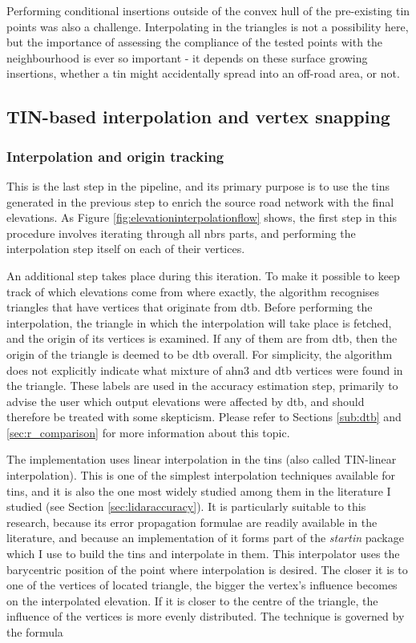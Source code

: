 Performing conditional insertions outside of the convex hull of the pre-existing \ac{tin} points was also a challenge. Interpolating in the triangles is not a possibility here, but the importance of assessing the compliance of the tested points with the neighbourhood is ever so important - it depends on these surface growing insertions, whether a \ac{tin} might accidentally spread into an off-road area, or not.

\subsection{TIN-based interpolation and vertex snapping}
\label{sub:m_interpolation}

\subsubsection{Interpolation and origin tracking}

This is the last step in the pipeline, and its primary purpose is to use the \ac{tin}s generated in the previous step to enrich the source road network with the final elevations. As Figure \ref{fig:elevationinterpolationflow} shows, the first step in this procedure involves iterating through all \ac{nbrs} parts, and performing the interpolation step itself on each of their vertices.

An additional step takes place during this iteration. To make it possible to keep track of which elevations come from where exactly, the algorithm recognises triangles that have vertices that originate from \ac{dtb}. Before performing the interpolation, the triangle in which the interpolation will take place is fetched, and the origin of its vertices is examined. If any of them are from \ac{dtb}, then the origin of the triangle is deemed to be \ac{dtb} overall. For simplicity, the algorithm does not explicitly indicate what mixture of \ac{ahn3} and \ac{dtb} vertices were found in the triangle. These labels are used in the accuracy estimation step, primarily to advise the user which output elevations were affected by \ac{dtb}, and should therefore be treated with some skepticism. Please refer to Sections \ref{sub:dtb} and \ref{sec:r_comparison} for more information about this topic.

The implementation uses linear interpolation in the \ac{tin}s (also called TIN-linear interpolation). This is one of the simplest interpolation techniques available for \ac{tin}s, and it is also the one most widely studied among them in the literature I studied (see Section \ref{sec:lidaraccuracy}). It is particularly suitable to this research, because its error propagation formulae are readily available in the literature, and because an implementation of it forms part of the \textit{startin} package which I use to build the \ac{tin}s and interpolate in them. This interpolator uses the barycentric position of the point where interpolation is desired. The closer it is to one of the vertices of located triangle, the bigger the vertex's influence becomes on the interpolated elevation. If it is closer to the centre of the triangle, the influence of the vertices is more evenly distributed. The technique is governed by the formula

